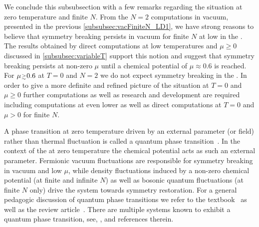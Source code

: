 	We conclude this subsubsection with a few remarks regarding the situation at zero temperature and finite $N$. From the $N=2$ computations in vacuum, presented in the previous \cref{subsubsec:vacFiniteN_LD1}, we have strong reasons to believe that \ZII{} symmetry breaking persists in vacuum for finite $N$ at low \rgscales{} in the \ir{}. The results obtained by direct computations at low temperatures and $\mu\geq 0$ discussed in \cref{subsubsec:variableT} support this notion and suggest that \ZII{} symmetry breaking persists at non-zero $\mu$ until a chemical potential of $\mu\approx 0.6$ is reached. For $\mu \smallergtrsim 0.6$ at $T=0$ and $N=2$ we do not expect symmetry breaking in the \ir{}. In order to give a more definite and refined picture of the situation at $T=0$ and $\mu\geq 0$ further computations as well as research and development are required including computations at even lower \rgscales{} as well as direct computations at $T=0$ and $\mu>0$ for finite $N$.
	
	A phase transition at zero temperature driven by an external parameter (or field) rather than thermal fluctuation is called a quantum phase transition~\cite{Sachdev:2011}. In the context of the \gnyBm{} at zero temperature the chemical potential acts as such an external parameter. Fermionic vacuum fluctuations are responsible for symmetry breaking in vacuum and low $\mu$, while density fluctuations induced by a non-zero chemical potential (at finite and infinite $N$) as well as bosonic quantum fluctuations (at finite $N$ only) drive the system towards symmetry restoration. For a general pedagogic discussion of quantum phase transitions we refer to the textbook~\cite{Sachdev:2011} as well as the review article~\cite{Dutta:2010}. There are multiple systems known to exhibit a quantum phase transition, see, \eg{},  and references therein.